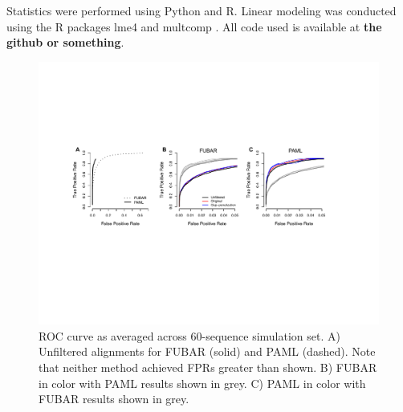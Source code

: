 \documentclass[10pt]{article}
\begin{document}
Statistics were performed using Python and R. Linear modeling was conducted using the R packages lme4 \citep{Bates2012} and
multcomp \citep{Hothorn2008}. All code used is available at \textbf{the github or something}.



\begin{figure}[H]
\centerline{\includegraphics[width=7in]{Figures/roc.pdf}}
\caption{\label{roc} ROC curve as averaged across 60-sequence simulation set. A) Unfiltered alignments for FUBAR (solid) and PAML (dashed). Note that neither method achieved FPRs greater than shown. B) FUBAR in color with PAML results shown in grey. C) PAML in color with FUBAR results shown in grey.}
\end{figure}
\end{document}
